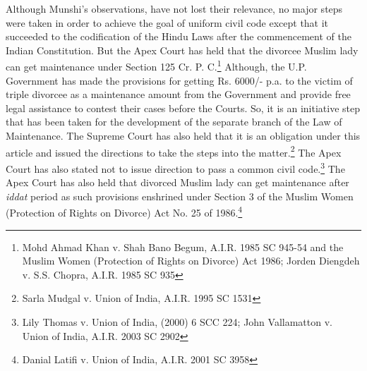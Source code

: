\begin{multicols}{2}
Although Munshi’s observations, have not lost their relevance, no major steps were taken in
order to achieve the goal of uniform civil code except that it succeeded to the codification of
the Hindu Laws after the commencement of the Indian Constitution. But the Apex Court has
held that the divorcee Muslim lady can get maintenance under Section 125 Cr. P. C.\footnote{ Mohd Ahmad Khan v. Shah Bano Begum, A.I.R. 1985 SC 945-54 and the Muslim Women (Protection of Rights on Divorce) Act 1986; Jorden Diengdeh v. S.S. Chopra, A.I.R. 1985 SC 935}
Although, the U.P. Government has made the provisions for getting Rs. 6000/- p.a. to the
victim of triple divorcee as a maintenance amount from the Government and provide free
legal assistance to contest their cases before the Courts. So, it is an initiative step that has
been taken for the development of the separate branch of the Law of Maintenance. The
Supreme Court has also held that it is an obligation under this article and issued the directions
to take the steps into the matter.\footnote{Sarla Mudgal v. Union of India, A.I.R. 1995 SC 1531} The Apex Court has also stated not to issue direction to
pass a common civil code.\footnote{ Lily Thomas v. Union of India, (2000) 6 SCC 224; John Vallamatton v. Union of India, A.I.R. 2003 SC
2902} The Apex Court has also held that divorced Muslim lady can get maintenance after {\it iddat} period as such provisions enshrined under Section 3 of the Muslim Women (Protection of Rights on Divorce) Act No. 25 of 1986.\footnote{Danial Latifi v. Union of India, A.I.R. 2001 SC 3958}



\end{multicols}
